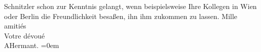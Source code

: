\begin{ledgroupsized}[t]{13cm}
{{{                        Schnitzler schon zur Kenntnis gelangt,
                     wenn beispielsweise Ihre Kollegen in Wien
                     oder Berlin die Freundlichkeit besaßen, ihn
                     ihm zukommen zu lassen.}}}\label{K_L02778-6h}\pend
           \pstart
           Mille amitiés{\\[\baselineskip]} Votre dévoué{\\[\baselineskip]}\spacefill\mbox{AHermant.}\pend
           \leftskip=0em{}
         
         \endnumbering{}\end{ledgroupsized}  \newcommand{\dateiname}{L02778}\newcommand{\titel}{Paul Goldmann an Arthur Schnitzler, 22. 6. [1896]}\newcommand{\editorInnen}{Martin Anton Müller und Laura Untner}
      